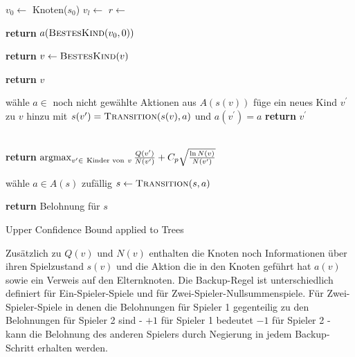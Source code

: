 \begin{algorithm}[H]
\begin{algorithmic}[1]
	\State $v_0\gets$ Knoten($s_0$)
		\State $v_l\gets$ 
		\State $r\gets$ 
		\State {}
	\EndWhile 
	
\State \textbf{return} $a(\Call{BestesKind}{v_0,0})$
\EndFunction

			\State \textbf{return} 
		\Else
			\State $v \gets \textsc{BestesKind}(v)$
		\EndIf
	\EndWhile
	 
	\State \textbf{return} $v$
\EndFunction

	\State wähle $a \in$ noch nicht gewählte Aktionen aus $A(s(v))$
	\State füge ein neues Kind $v^\prime$ zu $v$ hinzu
	\State mit $s(v^\prime) = \textsc{Transition}(s(v),a)$
		\State und $a(v^\prime) = a$
		\State \textbf{return} $v^\prime$
\EndFunction

\\
\State \textbf{return} $\operatorname*{argmax}_{v^\prime \in\ \text{Kinder von}\ v} \frac{Q(v^\prime)}{N(v^\prime)} + C_p \sqrt{\frac{\ln N(v)}{N(v^\prime)}}$
\EndFunction

\State wähle $a \in A(s)$ zufällig
\State $s \gets \textsc{Transition}(s,a)$
\EndWhile

\State \textbf{return} Belohnung für $s$
\EndFunction
\end{algorithmic}
\caption{Upper Confidence Bound applied to Trees\footnotemark}
\label{algo:UCT}
\end{algorithm}

Zusätzlich zu $Q(v)$ und $N(v)$ enthalten die Knoten noch Informationen über ihren Spielzustand $s(v)$ und die Aktion die in den Knoten geführt hat $a(v)$ sowie ein Verweis auf den Elternknoten. Die Backup-Regel ist unterschiedlich definiert für Ein-Spieler-Spiele und für Zwei-Spieler-Nullsummenspiele. Für Zwei-Spieler-Spiele in denen die Belohnungen für Spieler 1 gegenteilig zu den Belohnungen für Spieler 2 sind - $+1$ für Spieler 1 bedeutet $-1$ für Spieler 2 - kann die Belohnung des anderen Spielers durch Negierung in jedem Backup-Schritt erhalten werden.


